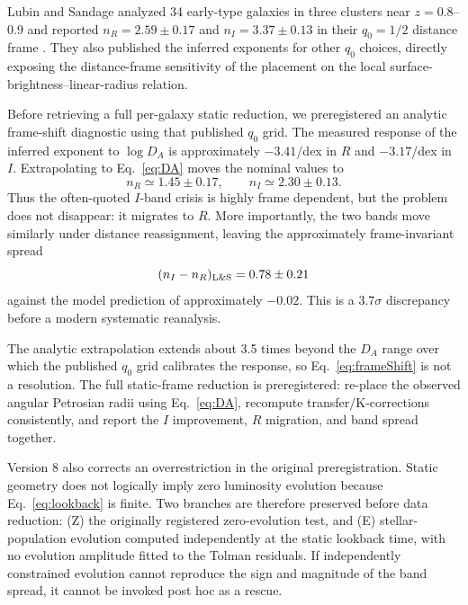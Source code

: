 \documentclass[11pt]{article}
\begin{document}
Lubin and Sandage analyzed 34 early-type galaxies in three clusters near $z=0.8$--0.9 and reported $n_R=2.59\pm0.17$ and $n_I=3.37\pm0.13$ in their $q_0=1/2$ distance frame \citep{LubinSandageIII,LubinSandageIV}. They also published the inferred exponents for other $q_0$ choices, directly exposing the distance-frame sensitivity of the placement on the local surface-brightness--linear-radius relation.

Before retrieving a full per-galaxy static reduction, we preregistered an analytic frame-shift diagnostic using that published $q_0$ grid. The measured response of the inferred exponent to $\log D_A$ is approximately $-3.41$/dex in $R$ and $-3.17$/dex in $I$. Extrapolating to Eq.~\eqref{eq:DA} moves the nominal values to
\begin{equation}
 n_R\simeq1.45\pm0.17,
 \qquad
 n_I\simeq2.30\pm0.13.
 \label{eq:frameShift}
\end{equation}
Thus the often-quoted $I$-band crisis is highly frame dependent, but the problem does not disappear: it migrates to $R$. More importantly, the two bands move similarly under distance reassignment, leaving the approximately frame-invariant spread
\begin{equation}
 (n_I-n_R)_{\rm L\&S}=0.78\pm0.21
 \label{eq:spread}
\end{equation}
against the model prediction of approximately $-0.02$. This is a 3.7$\sigma$ discrepancy before a modern systematic reanalysis.

The analytic extrapolation extends about 3.5 times beyond the $D_A$ range over which the published $q_0$ grid calibrates the response, so Eq.~\eqref{eq:frameShift} is not a resolution. The full static-frame reduction is preregistered: re-place the observed angular Petrosian radii using Eq.~\eqref{eq:DA}, recompute transfer/K-corrections consistently, and report the $I$ improvement, $R$ migration, and band spread together.

Version 8 also corrects an overrestriction in the original preregistration. Static geometry does not logically imply zero luminosity evolution because Eq.~\eqref{eq:lookback} is finite. Two branches are therefore preserved before data reduction: (Z) the originally registered zero-evolution test, and (E) stellar-population evolution computed independently at the static lookback time, with no evolution amplitude fitted to the Tolman residuals. If independently constrained evolution cannot reproduce the sign and magnitude of the band spread, it cannot be invoked post hoc as a rescue.
\end{document}
